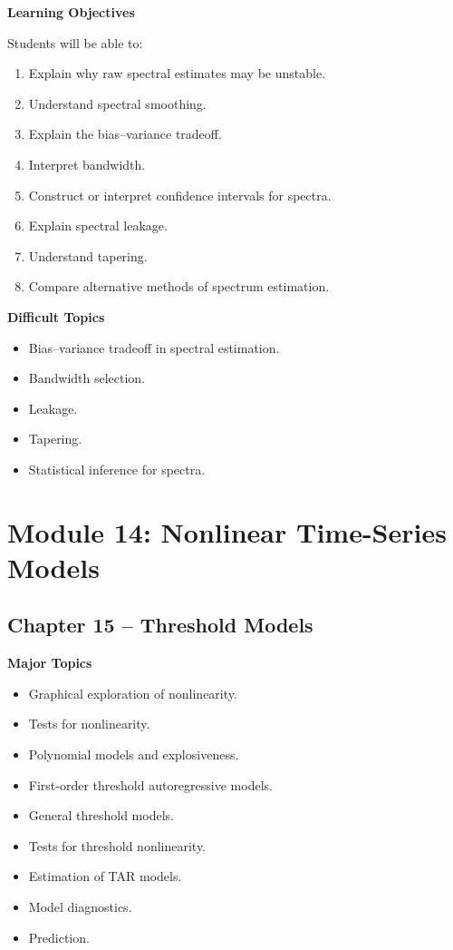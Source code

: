 \documentclass[11pt,a4paper]{article}
\begin{document}
\textbf{Learning Objectives}

Students will be able to:

\begin{enumerate}
    \item Explain why raw spectral estimates may be unstable.
    \item Understand spectral smoothing.
    \item Explain the bias--variance tradeoff.
    \item Interpret bandwidth.
    \item Construct or interpret confidence intervals for spectra.
    \item Explain spectral leakage.
    \item Understand tapering.
    \item Compare alternative methods of spectrum estimation.
\end{enumerate}

\textbf{Difficult Topics}

\begin{itemize}
    \item Bias--variance tradeoff in spectral estimation.
    \item Bandwidth selection.
    \item Leakage.
    \item Tapering.
    \item Statistical inference for spectra.
\end{itemize}

\section{Module 14: Nonlinear Time-Series Models}

\subsection{Chapter 15 -- Threshold Models}

\textbf{Major Topics}

\begin{itemize}
    \item Graphical exploration of nonlinearity.
    \item Tests for nonlinearity.
    \item Polynomial models and explosiveness.
    \item First-order threshold autoregressive models.
    \item General threshold models.
    \item Tests for threshold nonlinearity.
    \item Estimation of TAR models.
    \item Model diagnostics.
    \item Prediction.
\end{itemize}
\end{document}

